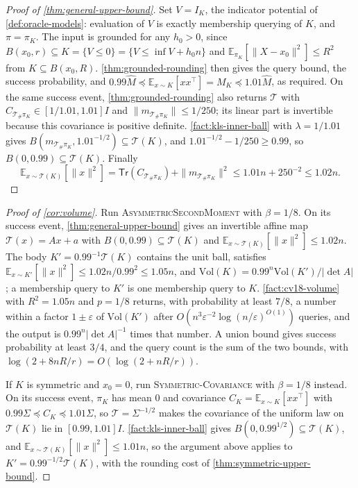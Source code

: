 \documentclass[11pt]{article}
\numberwithin{equation}{section}
\theoremstyle{definition}
\newcommand{\eps}{\varepsilon}
\newcommand{\Vol}{\mathrm{Vol}}
\newcommand{\E}[2]{\mathbb{E}_{#1}\left[#2\right]}
\newcommand{\Tr}[1]{\mathsf{Tr}\left(#1\right)}
\newcommand{\algname}[1]{\textnormal{\textsc{#1}}}
\begin{document}
\begin{proof}[Proof of \cref{thm:general-upper-bound}]
Set $V=I_K$, the indicator potential of \cref{def:oracle-models}: evaluation of
$V$ is exactly membership querying of
$K$, and
$\pi=\pi_K$.
The input is grounded for any $h_0>0$, since
$B(x_0,r)\subseteq K=\{V\leq0\}=\{V\leq\inf V+h_0n\}$ and
$\E{\pi_K}{\|X-x_0\|^2}\leq R^2$ from
$K\subseteq B(x_0,R)$.
\cref{thm:grounded-rounding} then gives the query bound, the success
probability, and
$0.99\widehat M\preceq\E{x\sim K}{xx^\top}=M_K \preceq1.01\widehat M$, as
required.
On the same success event, \cref{thm:grounded-rounding} also returns
$\mathcal T$ with
$C_{\mathcal T_\#\pi_K}\in[1/1.01,1.01]I$ and
$\|m_{\mathcal T_\#\pi_K}\|\leq1/250$; its linear part is invertible because
this covariance is positive definite.
\cref{fact:kls-inner-ball} with $\lambda=1/1.01$ gives
$B(m_{\mathcal T_\#\pi_K},1.01^{-1/2})\subseteq\mathcal T(K)$, and
$1.01^{-1/2}-1/250\geq0.99$, so
$B(0,0.99)\subseteq\mathcal T(K)$.
Finally
\[
\E{x\sim\mathcal T(K)}{\|x\|^2}
=\Tr{C_{\mathcal T_\#\pi_K}}+\|m_{\mathcal T_\#\pi_K}\|^2
\leq1.01n+250^{-2}
\leq1.02n.
\]
\end{proof}

\begin{proof}[Proof of \cref{cor:volume}]
Run \algname{AsymmetricSecondMoment} with $\beta=1/8$.
On its success event, \cref{thm:general-upper-bound} gives an invertible
affine map
$\mathcal T(x)=Ax+a$ with
$B(0,0.99)\subseteq\mathcal T(K)$ and
$\E{x\sim\mathcal T(K)}{\|x\|^2}\leq1.02n$.
The body $K'=0.99^{-1}\mathcal T(K)$ contains the unit ball, satisfies
$\E{x\sim K'}{\|x\|^2}\leq1.02n/0.99^2\leq1.05n$, and
$\Vol(K)=0.99^n\Vol(K')/|\det A|$; a membership query to
$K'$ is one membership query to
$K$.
\cref{fact:cv18-volume} with $R^2=1.05n$ and
$p=1/8$ returns, with probability at least
$7/8$, a number within a factor
$1\pm\eps$ of
$\Vol(K')$ after
$O(n^3\eps^{-2}\log(n/\eps)^{O(1)})$ queries, and the output is
$0.99^n|\det A|^{-1}$ times that number.
A union bound gives success probability at least $3/4$, and the query count
is the sum of the two bounds, with
$\log(2+8nR/r)=O(\log(2+nR/r))$.

If $K$ is symmetric and $x_0=0$, run
\algname{Symmetric-Covariance} with
$\beta=1/8$ instead.
On its success event, $\pi_K$ has mean
$0$ and covariance
$C_K=\E{x\sim K}{xx^\top}$ with
$0.99\Sigma\preceq C_K\preceq1.01\Sigma$, so
$\mathcal T=\Sigma^{-1/2}$ makes the covariance of the uniform law on
$\mathcal T(K)$ lie in
$[0.99,1.01]I$.
\cref{fact:kls-inner-ball} gives $B(0,0.99^{1/2})\subseteq\mathcal T(K)$, and
$\E{x\sim\mathcal T(K)}{\|x\|^2}\leq1.01n$, so the argument above applies
to
$K'=0.99^{-1/2}\mathcal T(K)$, with the rounding cost of
\cref{thm:symmetric-upper-bound}.
\end{proof}
\end{document}
